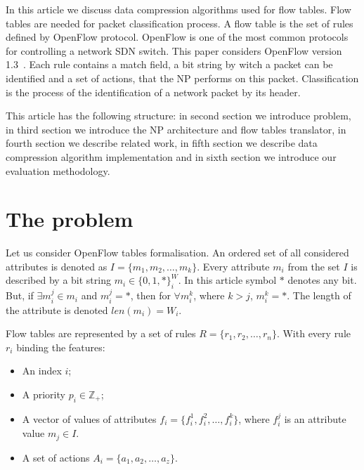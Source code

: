 \documentclass[conference]{IEEEtran}
\begin{document}
        In this article we discuss data compression algorithms used for flow tables. Flow tables are needed for packet classification process. 
        A flow table is the set of rules defined by OpenFlow protocol. OpenFlow is one of the most common protocols 
        for controlling a network SDN switch. This paper considers OpenFlow version 1.3~\cite{openflow}. Each rule contains a match field, 
        a bit string by witch a packet can be identified and a set of actions, that the NP performs on this packet. 
        Classification is the process of the identification of a network packet by its header.

        This article has the following structure: in second section we introduce problem, in third section we introduce 
        the NP architecture and flow tables translator, in fourth section we describe related work, in fifth section we
        describe data compression algorithm implementation and in sixth section we introduce our evaluation methodology.

    \section{The problem}
    \label{sect:problem}
        Let us consider OpenFlow tables formalisation. An ordered set of all considered attributes is denoted as \(I=\{m_1,m_2,\ldots,m_k\}\). 
        Every attribute \(m_i\) from the set \(I\) is described by a bit string \(m_i \in \{0, 1, *\}^W_i\).
        In this article symbol \(*\) denotes any bit. But, if \(\exists m_i^j \in m_i\) and  \( m_i^j = *\), 
        then for \( \forall m_i^k \), where \(k > j\), \( m_i^k = *\). The length of the attribute is denoted \(len(m_i) = W_i\).

        Flow tables are represented by a set of rules \(R=\{r_1,r_2,\ldots,r_n\}\). With every rule \(r_i\) binding the features:
        \begin{itemize}
            \item An index \(i\);
            \item A priority \(p_i \in \mathbb{Z}_+\);
            \item A vector of values of attributes \(f_i=\{f_i^1,f_i^2,\ldots,f_i^k\}\), where \(f_i^j\) is an attribute value \(m_j\in I\). %
            \item A set of actions \(A_i = \{a_1, a_2, \ldots, a_z\} \).
        \end{itemize}
\end{document}
